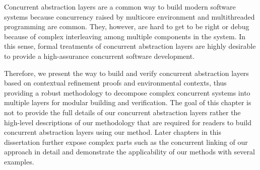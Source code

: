 
Concurrent abstraction layers are a common way to build modern software systems because concurrency raised by multicore environment and multithreaded programming are common.
They, however, are hard to get to be right or debug because of complex interleaving among multiple components in the system. 
In this sense, formal treatments of concurrent abstraction layers are highly desirable to provide a 
high-assurance concurrent software development. 

Therefore, we present the way to build and verify concurrent abstraction layers 
based on contextual refinement proofs and environmental contexts,
thus providing a robust methodology to decompose complex concurrent systems into multiple layers for modular building and verification.
The goal of this chapter is not to provide the full details of our concurrent abstraction layers rather the high-level descriptions of our methodology that are required for readers to build concurrent abstraction layers using our method. 
Later chapters in this dissertation further expose complex parts such as the concurrent linking of our approach in detail
and demonstrate the applicability of our methods with several examples. 